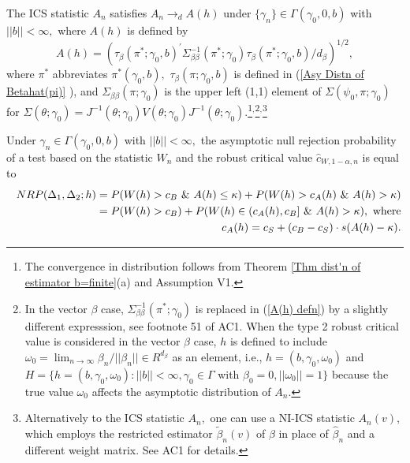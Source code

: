 \documentclass[12pt,thmsb,titlepage,final,oneside,letterpaper]{article}
\begin{document}
The ICS statistic $A_{n}$ satisfies $A_{n}\rightarrow _{d}A(h)$ under $\{
\gamma _{n}\} \in \Gamma (\gamma _{0},0,b)$ with $||b||<\infty ,$ where $%
A(h) $ is defined by%
\begin{equation}
A(h)=\left( \tau _{\beta }(\pi ^{\ast };\gamma _{0},b)^{\prime }\Sigma
_{\beta \beta }^{-1}(\pi ^{\ast };\gamma _{0})\tau _{\beta }(\pi ^{\ast
};\gamma _{0},b)/d_{\beta }\right) ^{1/2},  \label{A(h) defn}
\end{equation}%
where $\pi ^{\ast }$ abbreviates $\pi ^{\ast }(\gamma _{0},b),$ $\tau
_{\beta }(\pi ;\gamma _{0},b)$ is defined in (\ref{Asy Distn of Betahat(pi)}%
), and $\Sigma _{\beta \beta }(\pi ;\gamma _{0})$ is the upper left (1,1)
element of $\Sigma (\psi _{0},\pi ;\gamma _{0})$ for $\Sigma (\theta ;\gamma
_{0})=J^{-1}(\theta ;\gamma _{0})V(\theta ;\gamma _{0})J^{-1}(\theta ;\gamma
_{0}).$\footnote{%
The convergence in distribution follows from Theorem \ref{Thm dist'n of
estimator b=finite}(a) and Assumption V1.}$^{,}$\footnote{%
In the vector $\beta $ case, $\Sigma _{\beta \beta }^{-1}(\pi ^{\ast
};\gamma _{0})$ is replaced in (\ref{A(h) defn}) by a slightly different
expresssion, see footnote 51 of AC1. When the type 2 robust critical value
is considered in the vector $\beta $ case, $h$ is defined to include $\omega
_{0}=\lim_{n\rightarrow \infty }\beta _{n}/||\beta _{n}||\in R^{d_{\beta }}$
as an element, i.e., $h=(b,\gamma _{0},\omega _{0})$ and $H=\{h=(b,\gamma
_{0},\omega _{0}):||b||<\infty ,\gamma _{0}\in \Gamma $ with $\beta
_{0}=0,||\omega _{0}||=1\}$ because the true value $\omega _{0}$ affects the
asymptotic distribution of $A_{n}.$}$^{,}$\footnote{%
Alternatively to the ICS statistic $A_{n},$ one can use a NI-ICS statistic $%
A_{n}(v),$ which employs the restricted estimator $\widetilde{\beta }_{n}(v)$
of $\beta $ in place of $\widehat{\beta }_{n}$ and a different weight
matrix. See AC1 for details.
\par
{}}

Under $\gamma _{n}\in \Gamma (\gamma _{0},0,b)$ with $||b||<\infty ,$ the
asymptotic null rejection probability of a test based on the statistic $%
W_{n} $ and the robust critical value $\widehat{c}_{W,1-\alpha ,n}$ is equal
to%
\begin{eqnarray}
&&\hspace{-0.2in}NRP(\Delta _{1},\Delta _{2};h)\overset{}{=}P(W(h)\overset{}{%
>}c_{B}\text{ \& }A(h)\overset{}{\leq }\kappa )+P(W(h)\overset{}{>}c_{A}(h)%
\text{ \& }A(h)\overset{}{>}\kappa )  \notag \\
&&\hspace{-0.2in}\hspace{1.21in}\overset{}{=}P(W(h)\overset{}{>}c_{B})+P(W(h)%
\overset{}{\in }(c_{A}(h),c_{B}]\text{ \& }A(h)\overset{}{>}\kappa ),\text{
where}  \notag \\
&&\hspace{-0.2in}c_{A}(h)\overset{}{=}c_{S}+(c_{B}-c_{S})\cdot s(A(h)-\kappa
).  \label{NRP defn}
\end{eqnarray}
\end{document}
